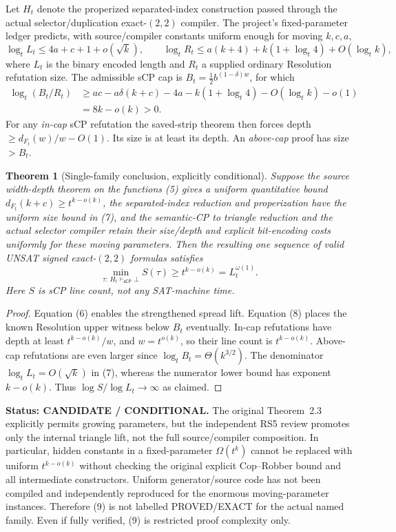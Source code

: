 \documentclass[11pt]{article}
\newtheorem{theorem}{Theorem}
\newcommand{\sCP}{\mathsf{sCP}}
\newcommand{\COND}{\textbf{CONDITIONAL}}
\newcommand{\CAND}{\textbf{CANDIDATE}}
\begin{document}
Let $H_t$ denote the properized separated-index construction passed
through the actual selector/duplication exact-$(2,2)$ compiler. The
project's fixed-parameter ledger predicts, with source/compiler
constants uniform enough for moving $k,c,a$,
\[
 \log_t L_t\le 4a+c+1+o(\sqrt{k}),\qquad
 \log_t R_t\le a(k+4)+k(1+\log_t4)+O(\log_t k),          \tag{7}
\]
where $L_t$ is the binary encoded length and $R_t$ a supplied
ordinary Resolution refutation size. The admissible sCP cap is
$B_t=\tfrac12b^{(1-\delta)w}$, for which
\[
\begin{aligned}
 \log_t(B_t/R_t)
 &\ge ac-a\delta(k+c)-4a-k(1+\log_t4)
       -O(\log_t k) -o(1)\\
 &=8k-o(k)>0.                                          \tag{8}
\end{aligned}
\]
For any \emph{in-cap} sCP refutation the saved-strip theorem then
forces depth $\ge d_{F_t}(w)/w-O(1)$. Its size is at least its
depth. An \emph{above-cap} proof has size $>B_t$.

\begin{theorem}[Single-family conclusion, explicitly conditional]
\label{thm:single}
Suppose the source width-depth theorem on the functions (5) gives
a uniform quantitative bound
$d_{F_t}(k+c)\ge t^{k-o(k)}$, the separated-index reduction and
properization have the uniform size bound in (7), and the
semantic-CP to triangle reduction and the \emph{actual} selector
compiler retain their size/depth and explicit bit-encoding costs
uniformly for these moving parameters. Then the resulting one
sequence of valid UNSAT signed exact-$(2,2)$ formulas satisfies
\[
 \min_{\tau:\,H_t\vdash_{\sCP}\bot}S(\tau)
      \ge t^{k-o(k)}=L_t^{\omega(1)}.                  \tag{9}
\]
Here $S$ is sCP \emph{line count}, not any SAT-machine time.
\end{theorem}
\begin{proof}
Equation (6) enables the strengthened spread lift.
Equation (8) places the known Resolution upper witness below
$B_t$ eventually. In-cap refutations have depth at least
$t^{k-o(k)}/w$, and $w=t^{o(k)}$, so their line count is
$t^{k-o(k)}$. Above-cap refutations are even larger since
$\log_t B_t=\Theta(k^{3/2})$.
The denominator $\log_t L_t=O(\sqrt{k})$ in (7), whereas
the numerator lower bound has exponent $k-o(k)$.
Thus $\log S/\log L_t\to\infty$ as claimed.
\end{proof}
\noindent\textbf{Status: \CAND{} / \COND{}.}
The original Theorem~2.3 explicitly permits growing parameters, but
the independent RS5 review promotes only the internal triangle lift,
not the full source/compiler composition. In particular, hidden
constants in a fixed-parameter $\Omega(t^k)$ cannot be replaced with
uniform $t^{k-o(k)}$ without checking the original explicit
Cop--Robber bound and all intermediate constructors. Uniform
generator/source code has not been compiled and independently
reproduced for the enormous moving-parameter instances. Therefore
(9) is not labelled PROVED/EXACT for the actual named family.
Even if fully verified, (9) is restricted proof complexity only.
\end{document}
